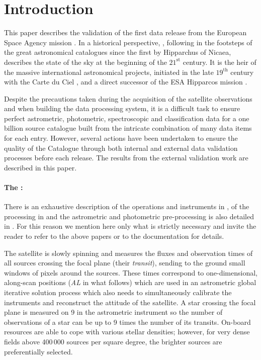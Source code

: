 \section{Introduction}


This paper describes the validation of the first data release 
from the European Space Agency mission {\gaia} \citep{DPACP-18}.
In a historical perspective, {\gaia}, following in the footsteps 
of the great astronomical catalogues since the first by Hipparchus of Nicaea, 
describes the state of the sky at the beginning of the $21^\mathrm{st}$ century.
It is the heir of the massive international astronomical projects, 
initiated in the late $19^\mathrm{th}$ century with the Carte du Ciel \citep{2000A&G....41e..16J}, 
and a direct successor of the ESA Hipparcos mission \citep{1997A&A...323L..49P}.

Despite the precautions taken during the acquisition of the satellite 
observations and when building the data processing system, it is a difficult
task to ensure perfect astrometric, photometric, spectroscopic and 
classification data for a one billion source catalogue built from the intricate 
combination of many data items for each entry. 
However, several actions have been undertaken to ensure the quality of the 
{\gaia} Catalogue through both internal and external data validation processes 
before each release.
The results from the external validation work are described in this paper.

\paragraph{The {}:}
There is an exhaustive description of the {\gaia} operations and 
instruments in \citet{DPACP-18}, of the {\gaia} processing in \citet{DPACP-8} 
and the astrometric and photometric pre-processing is also detailed in \citet{DPACP-7}.
For this reason we mention here only what is strictly necessary and
invite the reader to refer to the above papers or to the {\gaia}
documentation for details.

The {\gaia} satellite is slowly spinning and measures the fluxes and observation times 
of all sources crossing the focal plane (their {\gaia} {\it transit}), sending to the 
ground small windows of pixels around the sources. These times correspond to 
one-dimensional, along-scan positions ({\it AL} in what follows) 
which are used in an astrometric global iterative solution process 
\citep[AGIS,][]{DPACP-14} which also needs to simultaneously calibrate the 
instruments and reconstruct the attitude of the satellite. A star crossing
the focal plane is measured on 9  in the astrometric instrument so the number
of observations of a star can be up to 9 times the number of its transits.
On-board resources are able to cope with various stellar densities; however, 
for very dense fields above 400\,000 sources per square degree, 
the brighter sources are preferentially selected.

